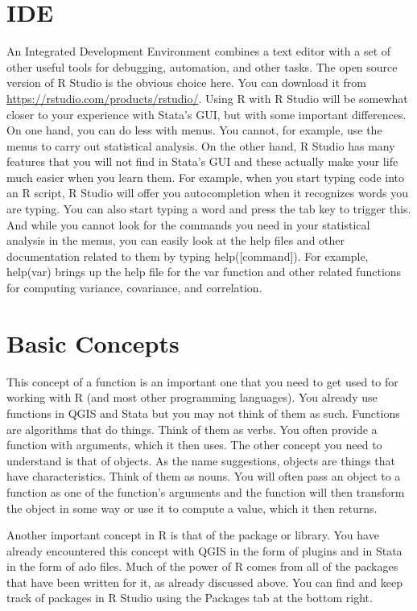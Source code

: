 \documentclass[]{book}
\begin{document}
\hypertarget{ide}{%
\section{IDE}\label{ide}}

An Integrated Development Environment combines a text editor with a set of other useful tools for debugging, automation, and other tasks. The open source version of R Studio is the obvious choice here. You can download it from \url{https://rstudio.com/products/rstudio/}. Using R with R Studio will be somewhat closer to your experience with Stata's GUI, but with some important differences. On one hand, you can do less with menus. You cannot, for example, use the menus to carry out statistical analysis. On the other hand, R Studio has many features that you will not find in Stata's GUI and these actually make your life much easier when you learn them. For example, when you start typing code into an R script, R Studio will offer you autocompletion when it recognizes words you are typing. You can also start typing a word and press the tab key to trigger this. And while you cannot look for the commands you need in your statistical analysis in the menus, you can easily look at the help files and other documentation related to them by typing help({[}command{]}). For example, help(var) brings up the help file for the var function and other related functions for computing variance, covariance, and correlation.

\hypertarget{basic-concepts}{%
\section{Basic Concepts}\label{basic-concepts}}

This concept of a function is an important one that you need to get used to for working with R (and most other programming languages). You already use functions in QGIS and Stata but you may not think of them as such. Functions are algorithms that do things. Think of them as verbs. You often provide a function with arguments, which it then uses. The other concept you need to understand is that of objects. As the name suggestions, objects are things that have characteristics. Think of them as nouns. You will often pass an object to a function as one of the function's arguments and the function will then transform the object in some way or use it to compute a value, which it then returns.

Another important concept in R is that of the package or library. You have already encountered this concept with QGIS in the form of plugins and in Stata in the form of ado files. Much of the power of R comes from all of the packages that have been written for it, as already discussed above. You can find and keep track of packages in R Studio using the Packages tab at the bottom right.
\end{document}
